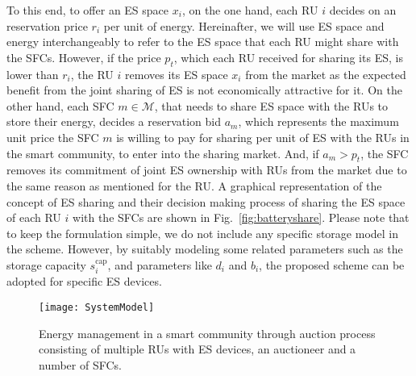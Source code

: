 \documentclass[journal,10pt]{IEEEtran}
\begin{document}
To this end, to offer an ES space $x_i$, on the one hand, each RU $i$ decides on an reservation price $r_i$ per unit of energy. Hereinafter, we will use ES space and energy interchangeably to refer to the ES space that each RU might share with the SFCs. However, if the price $p_t$, which each RU received for sharing its ES, is lower than $r_i$, the RU $i$ removes its ES space $x_i$ from the market as the expected benefit from the joint sharing of ES is not economically attractive for it. On the other hand, each SFC $m\in\mathcal{M}$, that needs to share ES space with the RUs to store their energy, decides a reservation bid $a_m$, which represents the maximum unit price the SFC $m$ is willing to pay for sharing per unit of ES with the RUs in the smart community, to enter into the sharing market. And, if $a_m>p_t$, the SFC removes its commitment of joint ES ownership with RUs from the market due to the same reason as mentioned for the RU. A graphical representation of the concept of ES sharing and their decision making process of sharing the ES space of each RU $i$ with the SFCs are shown in Fig.~\ref{fig:batteryshare}. Please note that to keep the formulation simple, we do not include any specific storage model in the scheme. However, by suitably modeling some related parameters such as the storage capacity $s_i^\text{cap}$, and parameters like $d_i$ and $b_i$, the proposed scheme can be adopted for specific ES devices.
\begin{figure}[t]
\centering
\texttt{[image: SystemModel]}
\caption{Energy management in a smart community through auction process consisting of multiple RUs with ES devices, an auctioneer and a number of SFCs.} \label{fig:system_model}
\end{figure}
\end{document}
